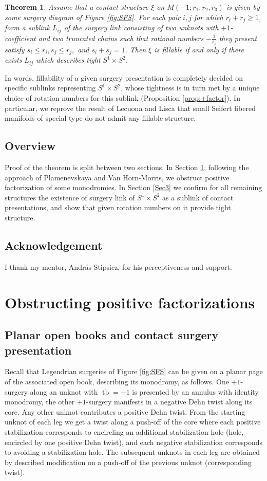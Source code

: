\documentclass{amsart}
\newtheorem{thm}{Theorem}[section]
\theoremstyle{definition}
\begin{document}
\begin{thm}\label{thm}
Assume that a contact structure $\xi$ on $M(-1;r_1,r_2,r_3)$ is given by some surgery diagram of Figure \ref{fig:SFS}. For each pair $i,j$ for which $r_i+r_j\geq1$, form a sublink $L_{ij}$ of the surgery link consisting of two unknots with $+1$-coefficient and two truncated chains such that rational numbers $-\frac{1}{s_i}$ they present satisfy $s_i\leq r_i, s_j\leq r_j,$ and $s_i+s_j=1$. Then $\xi$ is fillable if and only if there exists $L_{ij}$ which describes tight $S^1\times S^2$.
\end{thm}

In words, fillability of a given surgery presentation is completely decided on specific sublinks representing $S^1\times S^2$, whose tightness is in turn met by a unique choice of rotation numbers for this sublink (Proposition \ref{prop:+factor}). In particular, we reprove the result of Lecuona and Lisca that small Seifert fibered manifolds of special type do not admit any fillable structure.

\subsection*{Overview} Proof of the theorem is split between two sections. In Section \ref{Sec2}, following the approach of Plamenevskaya and Van Horn-Morris, we obstruct positive factorization of some monodromies. In Section \ref{Sec3} we confirm for all remaining structures the existence of surgery link of $S^1\times S^2$ as a sublink of contact presentations, and show that given rotation numbers on it provide tight structure.

\subsection*{Acknowledgement} I thank my mentor, Andr\'as Stipsicz, for his perceptiveness and support.

\section{Obstructing positive factorizations}\label{Sec2}
\subsection{Planar open books and contact surgery presentation}
Recall that Legendrian surgeries of Figure \ref{fig:SFS} can be given on a planar page of the associated open book, describing its monodromy, as follows. One $+1$-surgery along an unknot with $\operatorname{tb}=-1$ is presented by an annulus with identity monodromy, the other $+1$-surgery manifests in a negative Dehn twist along its core. Any other unknot contributes a positive Dehn twist. From the starting unknot of each leg we get a twist along a push-off of the core where each positive stabilization corresponds to encircling an additional stabilization hole (hole, encircled by one positive Dehn twist), and each negative stabilization corresponds to avoiding a stabilization hole. The subsequent unknots in each leg are obtained by described modification on a push-off of the previous unknot (corresponding twist).
\end{document}
